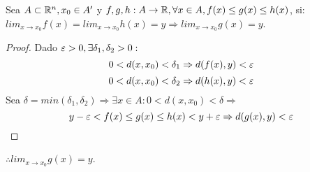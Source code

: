 \begin{theorem}
  Sea $A \subset \mathbb{R}^n, x_0 \in A^{\prime}$ y $f, g, h: A \to \mathbb{R}, \forall x \in A, f(x) \leq g(x) \leq h(x)$, si: \\
  $lim_{x \to x_0} f(x) = lim_{x \to x_0} h(x) = y \Rightarrow lim_{x \to x_0} g(x) = y$.
  \begin{proof}
    Dado $\varepsilon > 0, \exists \delta_1, \delta_2 > 0 :$ \\
    \begin{equation}
      0 < d(x, x_0) < \delta_1 \Rightarrow d(f(x), y) < \varepsilon
    \end{equation}
    \begin{equation}
      0 < d(x, x_0) < \delta_2 \Rightarrow d(h(x), y) < \varepsilon
    \end{equation}
    Sea $\delta = min(\delta_1, \delta_2) \Rightarrow \exists x \in A : 0 < d(x, x_0) < \delta \Rightarrow$ \\
    \begin{equation}
      y - \varepsilon < f(x) \leq g(x) \leq h(x) < y + \varepsilon \Rightarrow d(g(x), y) < \varepsilon
    \end{equation}
  \end{proof}
  $\therefore lim_{x \to x_0} g(x) = y$.
\end{theorem}
